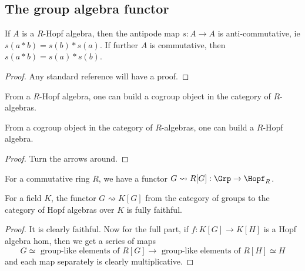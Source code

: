 \subsection{The group algebra functor}


\begin{proposition}
  \label{0-hopf-antipode-antihom}
  \uses{}
  \leanok

  If $A$ is a $R$-Hopf algebra, then the antipode map $s : A \to A$ is anti-commutative, ie $s(a * b) = s(b) * s(a)$. If further $A$ is commutative, then $s(a * b) = s(a) * s(b)$.
\end{proposition}
\begin{proof}
  \uses{}

  Any standard reference will have a proof.
\end{proof}


\begin{proposition}
  \label{0-hopf-cogrp-alg}
  \uses{}
  \leanok

  From a $R$-Hopf algebra, one can build a cogroup object in the category of $R$-algebras.

  From a cogroup object in the category of $R$-algebras, one can build a $R$-Hopf algebra.
\end{proposition}
\begin{proof}
  \leanok

  Turn the arrows around.
\end{proof}


\begin{definition}
  \label{0-grp-alg}
  \leanok

  For a commutative ring $R$, we have a functor $G \rightsquigarrow R[G] : \Grp \to \Hopf_R$.
\end{definition}


\begin{proposition}
  \label{0-full-faithful-grp-alg}
  \leanok

  For a field $K$, the functor $G \rightsquigarrow K[G]$ from the category of groups to the category of Hopf algebras over $K$ is fully faithful.
\end{proposition}
\begin{proof}
  \leanok

  It is clearly faithful.
  Now for the full part, if $f : K[G] \to K[H]$ is a Hopf algebra hom, then we get a series of maps
  \[
    G \simeq \text{ group-like elements of } R[G] \to \text{ group-like elements of } R[H] \simeq H
  \]
  and each map separately is clearly multiplicative.
\end{proof}
